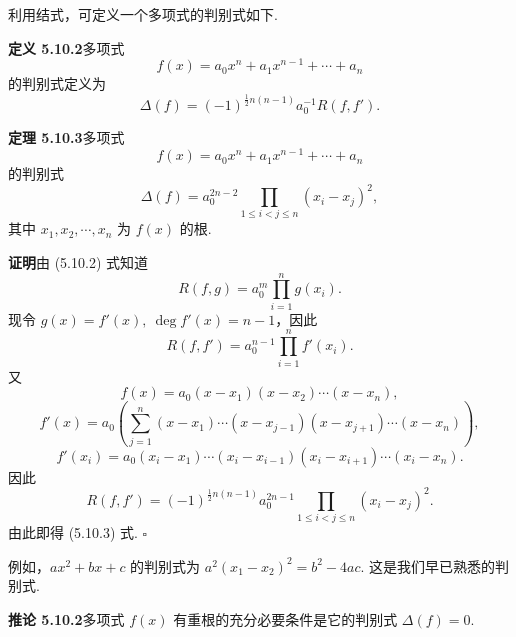 \documentclass[UTF8, 12pt, fontset=fandol, oneside]{ctexart}
\begin{document}
利用结式，可定义一个多项式的判别式如下.

\noindent\textbf{定义 5.10.2}\quad 多项式
\[
f(x)=a_0x^n+a_1x^{n-1}+\cdots+a_n
\]
的判别式定义为
\[
\Delta(f)=(-1)^{\frac12n(n-1)}a_0^{-1}R(f,f').
\]

\noindent\textbf{定理 5.10.3}\quad 多项式
\[
f(x)=a_0x^n+a_1x^{n-1}+\cdots+a_n
\]
的判别式
\begin{equation}
\Delta(f)=a_0^{2n-2}\prod_{1\leq i<j\leq n}(x_i-x_j)^2,
\tag{5.10.3}
\end{equation}
其中 $x_1,x_2,\cdots,x_n$ 为 $f(x)$ 的根.

\noindent\textbf{证明}\quad 由 (5.10.2) 式知道
\[
R(f,g)=a_0^m\prod_{i=1}^n g(x_i).
\]
现令 $g(x)=f'(x),\ \deg f'(x)=n-1$，因此
\[
R(f,f')=a_0^{n-1}\prod_{i=1}^n f'(x_i).
\]
又
\[
f(x)=a_0(x-x_1)(x-x_2)\cdots(x-x_n),
\]
\[
f'(x)=a_0\left(\sum_{j=1}^n(x-x_1)\cdots(x-x_{j-1})(x-x_{j+1})\cdots(x-x_n)\right),
\]
\[
f'(x_i)=a_0(x_i-x_1)\cdots(x_i-x_{i-1})(x_i-x_{i+1})\cdots(x_i-x_n).
\]
因此
\[
R(f,f')=(-1)^{\frac12n(n-1)}a_0^{2n-1}\prod_{1\leq i<j\leq n}(x_i-x_j)^2.
\]
由此即得 (5.10.3) 式. $\square$

例如，$ax^2+bx+c$ 的判别式为 $a^2(x_1-x_2)^2=b^2-4ac$. 这是我们早已熟悉的判别式.

\noindent\textbf{推论 5.10.2}\quad 多项式 $f(x)$ 有重根的充分必要条件是它的判别式 $\Delta(f)=0$.
\end{document}
